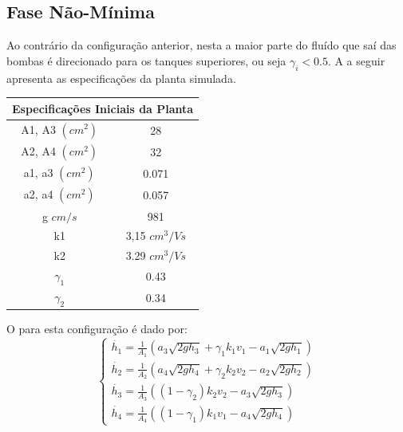 \subsection{Fase Não-Mínima}
Ao contrário da configuração anterior, nesta a maior parte do fluído que saí das bombas é direcionado  para os tanques superiores, ou seja $\gamma_i < 0.5$. A  a seguir apresenta as especificações da planta simulada.

\begin{center} \label{tabFaseNM}
	\begin{tabular}{|c|c|}
		\hline
		\multicolumn{2}{|c|}{Especificações Iniciais da Planta} \\
		\hline
		A1, A3 $(cm^2)$ & 28 \\ \hline
		A2, A4 $(cm^2)$ & 32 \\ \hline
		a1, a3 $(cm^2)$ & 0.071 \\ \hline
		a2, a4 $(cm^2)$ & 0.057 \\ \hline
		g $cm/s$ & 981 \\ \hline
		k1 & 3,15 $cm^3/Vs$ \\ \hline
		k2 & 3.29 $cm^3/Vs$ \\ \hline
		$\gamma_1$ & 0.43 \\ \hline
		$\gamma_2$ & 0.34 \\ \hline
		\hline
	\end{tabular}
\end{center}

O  para esta configuração é dado por:
\begin{equation}
\begin{cases}
\dot{h_{1}} = \frac{1}{A_{1}}(a_{3}\sqrt{2gh_{3}} + \gamma_{1}k_{1}v_{1} - a_{1}\sqrt{2gh_{1}})\\

\dot{h_{2}} = \frac{1}{A_{2}}(a_{4}\sqrt{2gh_{4}} + \gamma_{2}k_{2}v_{2} - a_{2}\sqrt{2gh_{2}})\\

\dot{h_{3}} = \frac{1}{A_{3}}((1 - \gamma_{2})k_{2}v_{2} - a_{3}\sqrt{2gh_{3}})\\

\dot{h_{4}} = \frac{1}{A_{4}}((1 - \gamma_{1})k_{1}v_{1} - a_{4}\sqrt{2gh_{4}})
\end{cases}
\label{eqFNMNL}
\end{equation}

